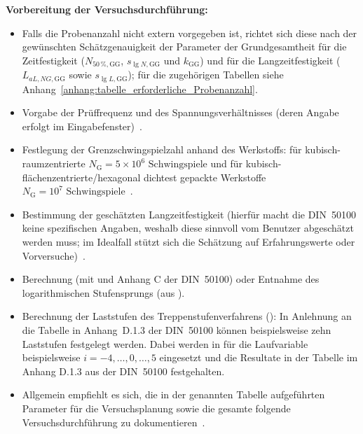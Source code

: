 \textbf{Vorbereitung der Versuchsdurchführung:}
	\begin{itemize}
    \item Falls die Probenanzahl nicht extern vorgegeben ist, richtet sich diese nach der gewünschten Schätzgenauigkeit der Parameter der Grundgesamtheit für die Zeitfestigkeit ($N_{50\,\%,\mathrm{GG}}$, $s_{\lg N,\mathrm{GG}}$ und $k_{\mathrm{GG}}$) und für die Langzeitfestigkeit ($L_{aL,NG,\mathrm{GG}}$ sowie $s_{\lg L,\mathrm{GG}}$); für die zugehörigen Tabellen siehe Anhang~\ref{anhang:tabelle_erforderliche_Probenanzahl}.
    \item Vorgabe der Prüffrequenz und des Spannungsverhältnisses (deren Angabe erfolgt im Eingabefenster)~\cite[Seite~65]{DIN50100}.
    \item Festlegung der Grenzschwingspielzahl anhand des Werkstoffs: für kubisch-raumzentrierte $N_{\text{G}} = 5 \times 10^6 \text{ Schwingspiele}$ und für kubisch-flächenzentrierte/hexagonal dichtest gepackte Werkstoffe $N_{\text{G}} = 10^7 \text{ Schwingspiele}$~\cite[Seite 16]{DIN50100}.
    \item Bestimmung der geschätzten Langzeitfestigkeit (hierfür macht die DIN~50100 keine spezifischen Angaben, weshalb diese sinnvoll vom Benutzer abgeschätzt werden muss; im Idealfall stützt sich die Schätzung auf Erfahrungswerte oder Vorversuche)~\cite[Seite~49]{DIN50100}.
    \item Berechnung (mit  und Anhang C der DIN~50100) oder Entnahme des logarithmischen Stufensprungs (aus ). 
    \item Berechnung der Laststufen des Treppenstufenverfahrens (): In Anlehnung an die Tabelle in Anhang~D.1.3 der DIN~50100 können beispielsweise zehn Laststufen festgelegt werden. Dabei werden in  für die Laufvariable beispielsweise $i=-4,\dots,0,\dots,5$ eingesetzt und die Resultate in der Tabelle im Anhang D.1.3 aus der DIN~50100 festgehalten.
    \item Allgemein empfiehlt es sich, die in der genannten Tabelle aufgeführten Parameter für die Versuchsplanung sowie die gesamte folgende Versuchsdurchführung zu dokumentieren~\cite[Seite~64--66]{DIN50100}. 
	\end{itemize}

